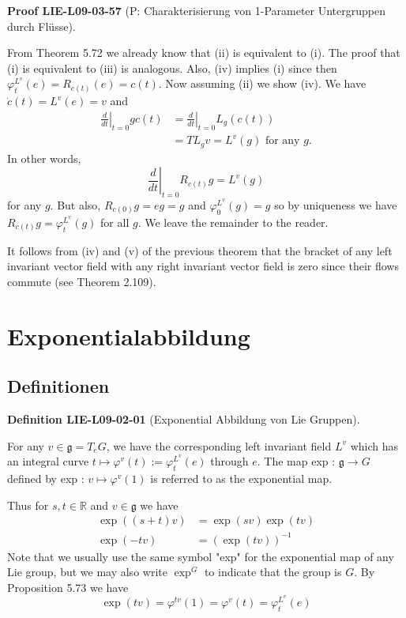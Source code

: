 \documentclass[10pt, letterpaper]{article}
\newcommand{\CustomHeading}[3]{%
  \par\medskip\noindent%
  \textbf{#1 #2} \textnormal{(#3)}.\enskip%
}
\newenvironment{DEF}[2]{\CustomHeading{Definition}{#1}{#2}}{}
\newenvironment{PROOF}[2]{\CustomHeading{Proof}{#1}{#2}}{}
\begin{document}
\begin{PROOF}{LIE-L09-03-57}{P: Charakterisierung von 1-Parameter Untergruppen durch Flüsse}
From Theorem 5.72 we already know that (ii) is equivalent to (i). The proof that (i) is equivalent to (iii) is analogous. Also, (iv) implies (i) since then $\varphi_{t}^{L^{v}}(e)=R_{c(t)}(e)=c(t)$. Now assuming (ii) we show (iv). We have $\dot{c}(t)=L^{v}(e)=v$ and
$$
\begin{aligned}
\left.\frac{d}{d t}\right|_{t=0} g c(t) & =\left.\frac{d}{d t}\right|_{t=0} L_{g}(c(t)) \\
& =T L_{g} v=L^{v}(g) \text { for any } g .
\end{aligned}
$$
In other words,
$$
\left.\frac{d}{d t}\right|_{t=0} R_{c(t)} g=L^{v}(g)
$$
for any $g$. But also, $R_{c(0)} g=e g=g$ and $\varphi_{0}^{L^{v}}(g)=g$ so by uniqueness we have $R_{c(t)} g=\varphi_{t}^{L^{v}}(g)$ for all $g$. We leave the remainder to the reader.

It follows from (iv) and (v) of the previous theorem that the bracket of any left invariant vector field with any right invariant vector field is zero since their flows commute (see Theorem 2.109).
\end{PROOF}

\section{Exponentialabbildung}

\subsection{Definitionen}

\begin{DEF}{LIE-L09-02-01}{Exponential Abbildung von Lie Gruppen}
For any $v \in \mathfrak{g}=T_{e} G$, we have the corresponding left invariant field $L^{v}$ which has an integral curve $t \mapsto \varphi^{v}(t):= \varphi_{t}^{L^{v}}(e)$ through $e$. The map exp : $\mathfrak{g} \rightarrow G$ defined by exp : $v \mapsto \varphi^{v}(1)$ is referred to as the exponential map.

Thus for $s, t \in \mathbb{R}$ and $v \in \mathfrak{g}$ we have
$$
\begin{aligned}
\exp ((s+t) v) & =\exp (s v) \exp (t v) \\
\exp (-t v) & =(\exp (t v))^{-1}
\end{aligned}
$$
Note that we usually use the same symbol "exp" for the exponential map of any Lie group, but we may also write $\exp ^{G}$ to indicate that the group is $G$. By Proposition 5.73 we have
$$
\exp (t v)=\varphi^{t v}(1)=\varphi^{v}(t)=\varphi_{t}^{L^{v}}(e)
$$
\end{DEF}
\end{document}
